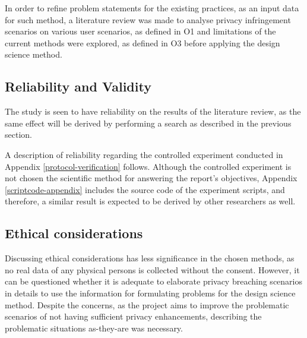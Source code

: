 In order to refine problem statements for the existing practices, as an input data for such method, a literature review was made to analyse privacy infringement scenarios on various user scenarios, as defined in O1 and limitations of the current methods were explored, as defined in O3 before applying the design science method.


\subsection{Reliability and Validity}
The study is seen to have reliability on the results of the literature review, as the same effect will be derived by performing a search as described in the previous section.

A description of reliability regarding the controlled experiment conducted in Appendix \ref{protocol-verification} follows.
Although the controlled experiment is not chosen the scientific method for answering the report's objectives, Appendix \ref{scriptcode-appendix} includes the source code of the experiment scripts, and therefore, a similar result is expected to be derived by other researchers as well. 

\subsection{Ethical considerations}
Discussing ethical considerations has less significance in the chosen methods, as no real data of any physical persons is collected without the consent.
However, it can be questioned whether it is adequate to elaborate privacy breaching scenarios in details to use the information for formulating problems for the design science method.
Despite the concerns, as the project aims to improve the problematic scenarios of not having sufficient privacy enhancements, describing the problematic situations as-they-are was necessary.
